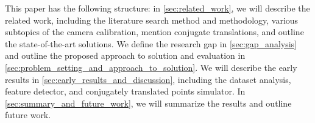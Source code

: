 This paper has the following structure: in \autoref{sec:related_work}, we will describe the related work, including the
literature search method and methodology, various subtopics of the camera
calibration, mention conjugate translations, and outline the state-of-the-art
solutions. We define the research gap in \autoref{sec:gap_analysis} and outline
the proposed approach to solution and evaluation in
\autoref{sec:problem_setting_and_approach_to_solution}. We will describe the
early results in \autoref{sec:early_results_and_discussion}, including the
dataset analysis, feature detector, and conjugately translated points simulator.
In \autoref{sec:summary_and_future_work}, we will summarize the results and
outline future work.

\endinput


